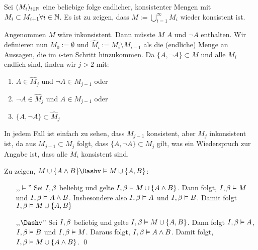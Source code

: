 
Sei $(M_i)_{i \in \mathbb{N}}$ eine beliebige folge endlicher, konsistenter Mengen mit $M_i \subset M_{i+1} \forall i\in \mathbb{N}$. Es ist zu zeigen, dass $ M := \bigcup_{i=1}^{\infty} M_i$ wieder konsistent ist.

\bigskip\noindent Angenommen $M$ wäre inkonsistent. Dann müsste $M$ $A$ und $\lnot A$ enthalten. Wir definieren nun $M_0 := \emptyset$ und $\hat{M}_i := M_{i} \setminus M_{i-1}$ als die (endliche) Menge an Aussagen, die im $i$-ten Schritt hinzukommen. Da $\{A, \lnot A\} \subset M$ und alle $M_i$ endlich sind, finden wir $j > 2$ mit:

\pagebreak

\begin{enumerate}
\item $A \in \hat{M}_j$ und $\lnot A \in M_{j-1}$ oder 
\item $\lnot A \in \hat{M}_j$  und $A \in M_{j-1}$ oder 
\item $\{A, \lnot A\} \subset \hat{M}_j$
\end{enumerate}

\bigskip\noindent In jedem Fall ist einfach zu sehen, dass $M_{j-1}$ konsistent, aber $M_j$ inkonsistent ist, da aus $M_{j-1} \subset M_j$ folgt, dass $\{A, \lnot A\} \subset M_j$ gilt, was ein Wiederspruch zur Angabe ist, dass alle $M_i$ konsistent sind.


Zu zeigen, $M \cup \{A \land B\} \bimodels M \cup \{A,B\}$:

\begin{itemize}
	\item[,,$\models$''] Sei $I, \beta$ beliebig und gelte $I, \beta \vDash M \cup \{A\land B\}$. Dann folgt, $I, \beta \vDash M$ und $I, \beta \vDash A\land B$. Insbesondere also $I, \beta \vDash A$ und $I, \beta \vDash B$. Damit folgt $I, \beta \vDash M \cup \{A,B\}$
	\item[,,$\lmodels$''] Sei $I, \beta$ beliebig und gelte $I, \beta \vDash M \cup \{A, B\}$. Dann folgt $I, \beta \vDash A$, $I, \beta \vDash B$ und $I, \beta \vDash M$. Daraus folgt, $I, \beta \vDash A\land B$. Damit folgt, $I, \beta \vDash M \cup \{A \land B\}$. \qed
\end{itemize}

